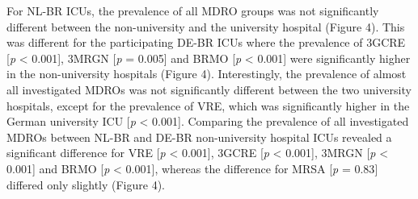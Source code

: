 \documentclass[
]{book}
\begin{document}
For NL-BR ICUs, the prevalence of all MDRO groups was not significantly different between the non-university and the university hospital (Figure 4). This was different for the participating DE-BR ICUs where the prevalence of 3GCRE {[}\emph{p} \textless{} 0.001{]}, 3MRGN {[}\emph{p} = 0.005{]} and BRMO {[}\emph{p} \textless{} 0.001{]} were significantly higher in the non-university hospitals (Figure 4). Interestingly, the prevalence of almost all investigated MDROs was not significantly different between the two university hospitals, except for the prevalence of VRE, which was significantly higher in the German university ICU {[}\emph{p} \textless{} 0.001{]}. Comparing the prevalence of all investigated MDROs between NL-BR and DE-BR non-university hospital ICUs revealed a significant difference for VRE {[}\emph{p} \textless{} 0.001{]}, 3GCRE {[}\emph{p} \textless{} 0.001{]}, 3MRGN {[}\emph{p} \textless{} 0.001{]} and BRMO {[}\emph{p} \textless{} 0.001{]}, whereas the difference for MRSA {[}\emph{p} = 0.83{]} differed only slightly (Figure 4).
\end{document}
